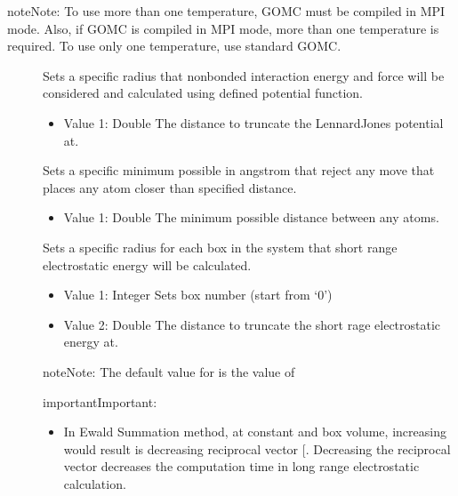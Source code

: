 \documentclass[letterpaper,10pt,english]{sphinxmanual}
\begin{document}
\begin{sphinxadmonition}{note}{Note:}
To use more than one temperature, GOMC must be compiled in MPI mode.  Also, if GOMC is compiled in MPI mode, more than one temperature is required.  To use only one temperature, use standard GOMC.
\end{sphinxadmonition}
\begin{description}
\item[{}] \leavevmode
Sets a specific radius that non\sphinxhyphen{}bonded interaction energy and force will be considered and calculated using defined potential function.
\begin{itemize}
\item {} 
Value 1: Double \sphinxhyphen{} The distance to truncate the Lennard\sphinxhyphen{}Jones potential at.

\end{itemize}

\item[{}] \leavevmode
Sets a specific minimum possible in angstrom that reject any move that places any atom closer than specified distance.
\begin{itemize}
\item {} 
Value 1: Double \sphinxhyphen{} The minimum possible distance between any atoms.

\end{itemize}

\item[{}] \leavevmode
Sets a specific radius for each box in the system that short range electrostatic energy will be calculated.
\begin{itemize}
\item {} 
Value 1: Integer \sphinxhyphen{} Sets box number (start from ‘0’)

\item {} 
Value 2: Double \sphinxhyphen{} The distance to truncate the short rage electrostatic energy at.

\end{itemize}

\begin{sphinxadmonition}{note}{Note:}
The default value for  is the value of 
\end{sphinxadmonition}

\begin{sphinxadmonition}{important}{Important:}\begin{itemize}
\item {} 
In Ewald Summation method, at constant  and box volume, increasing  would result is decreasing reciprocal vector {[}\sphinxhref{https://www.tandfonline.com/doi/abs/10.1080/08927029408022180}{Fincham 1993}{]}.
Decreasing the reciprocal vector decreases the computation time in long range electrostatic calculation.


\end{itemize}
\end{sphinxadmonition}
\end{description}
\end{document}
